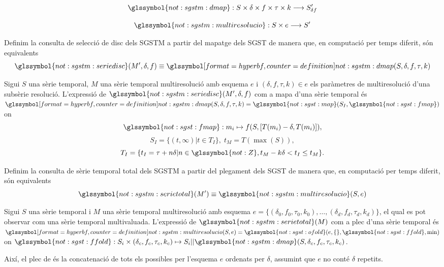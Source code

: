 \[
\glssymbol{not:sgstm:dmap}: S \times \delta \times f \times \tau \times k \longrightarrow
S'_{\delta f}
\]


\[
 \glssymbol{not:sgstm:multiresolucio}: S \times e  \longrightarrow S'
\]



Definim la consulta de selecció de disc dels \gls{SGSTM} a partir del
mapatge dels \gls{SGST} de manera que, en computació per temps
diferit, són equivalents
\[
\glssymbol{not:sgstm:seriedisc}(M',\delta,f) \equiv
\glssymboldef{not:sgstm:dmap}(S,\delta,f,\tau,k)
\]


\begin{definition}
  Sigui $S$ una sèrie temporal, $M$ una sèrie temporal multiresolució
  amb esquema $e$ i $(\delta,f,\tau,k)\in e$ els paràmetres de
  multiresolució d'una subsèrie resolució. L'expressió de
  $\glssymbol{not:sgstm:seriedisc}(M',\delta,f)$ com a mapa d'una sèrie
  temporal és $\glssymboldef{not:sgstm:dmap}(S,\delta,f,\tau,k)=
  \glssymbol{not:sgst:map}(S_I,\glssymbol{not:sgst:fmap})$ on
  \[
  \glssymbol{not:sgst:fmap}: m_i\mapsto f(S, [T(m_i)-\delta,T(m_i)]),
  \]
  \[
  S_I = \{ (t,\infty) | t\in T_I  \},\;  t_M = T(\max(S)),
  \]
  \[
  T_I = \{ t_I = \tau+n\delta | n\in\glssymbol{not:Z}, t_M - k\delta <
  t_I \leq t_M \}.
  \]
\end{definition}








Definim la consulta de sèrie temporal total dels \gls{SGSTM} a partir
del plegament dels \gls{SGST} de manera que, en computació per temps
diferit, són equivalents
\[
\glssymbol{not:sgstm:serietotal}(M') \equiv \glssymbol{not:sgstm:multiresolucio}(S,e)
\]

\begin{definition}
  Sigui $S$ una sèrie temporal i $M$ una sèrie temporal multiresolució
  amb esquema $e = \{ (\delta_0,f_0,\tau_0,k_0), \ldots,
  (\delta_d,f_d,\tau_d,k_d)\}$, el qual es pot observar com una sèrie
  temporal multivaluada.  L'expressió de
  $\glssymbol{not:sgstm:serietotal}(M)$ com a plec d'una sèrie
  temporal és $\glssymboldef{not:sgstm:multiresolucio}(S,e)=
  \glssymbol{not:sgst:ofold}(e,\{\},\glssymbol{not:sgst:ffold},\min)$
  on $\glssymbol{not:sgst:ffold}: S_i \times (\delta_c,f_c,\tau_c,k_c)
  \mapsto S_i ||
  \glssymbol{not:sgstm:dmap}(S,\delta_c,f_c,\tau_c,k_c)$.

  Així, el plec de  és la concatenació de
  tots els  possibles per l'esquema $e$
  ordenats per $\delta$, assumint que $e$ no conté $\delta$ repetits.
\end{definition}



